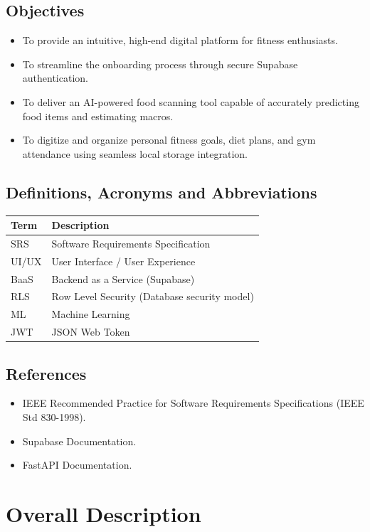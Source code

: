 \documentclass[12pt,a4paper]{article}
\begin{document}
\subsection{Objectives}
\begin{itemize}
    \item To provide an intuitive, high-end digital platform for fitness enthusiasts.
    \item To streamline the onboarding process through secure Supabase authentication.
    \item To deliver an AI-powered food scanning tool capable of accurately predicting food items and estimating macros.
    \item To digitize and organize personal fitness goals, diet plans, and gym attendance using seamless local storage integration.
\end{itemize}

\subsection{Definitions, Acronyms and Abbreviations}
\begin{longtable}{|p{3cm}|p{11cm}|}
\hline
\textbf{Term} & \textbf{Description} \\
\hline
SRS & Software Requirements Specification \\
\hline
UI/UX & User Interface / User Experience \\
\hline
BaaS & Backend as a Service (Supabase) \\
\hline
RLS & Row Level Security (Database security model) \\
\hline
ML & Machine Learning \\
\hline
JWT & JSON Web Token \\
\hline
\end{longtable}

\subsection{References}
\begin{itemize}
    \item IEEE Recommended Practice for Software Requirements Specifications (IEEE Std 830-1998).
    \item Supabase Documentation.
    \item FastAPI Documentation.
\end{itemize}

\section{Overall Description}
\end{document}
